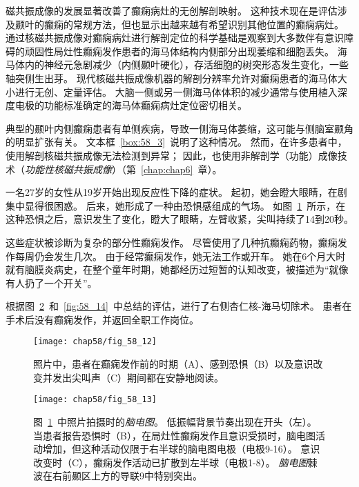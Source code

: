 磁共振成像的发展显著改善了癫痫病灶的无创解剖映射。
这种技术现在是评估涉及颞叶的癫痫的常规方法，但也显示出越来越有希望识别其他位置的癫痫病灶。
通过核磁共振成像对癫痫病灶进行解剖定位的科学基础是观察到大多数伴有意识障碍的顽固性局灶性癫痫发作患者的海马体结构内侧部分出现萎缩和细胞丢失。
海马体内的神经元急剧减少（内侧颞叶硬化），存活细胞的树突形态发生变化，一些轴突侧生出芽。
现代核磁共振成像机器的解剖分辨率允许对癫痫患者的海马体大小进行无创、定量评估。
大脑一侧或另一侧海马体体积的减少通常与使用植入深度电极的功能标准确定的海马体癫痫病灶定位密切相关。


典型的颞叶内侧癫痫患者有单侧疾病，导致一侧海马体萎缩，这可能与侧脑室颞角的明显扩张有关。
文本框~\ref{box:58_3}~说明了这种情况。
然而，在许多患者中，使用解剖核磁共振成像无法检测到异常；
因此，也使用非解剖学（功能）成像技术（\textit{功能性核磁共振成像}）（第~\ref{chap:chap6}~章）。


\begin{proposition}[神经解剖学导航术语] \label{box:58_3}
	
	\quad \quad 一名27岁的女性从19岁开始出现反应性下降的症状。
	起初，她会瞪大眼睛，在剧集中显得很困惑。
	后来，她形成了一种由恐惧感组成的气场。
	如图~\ref{fig:58_12}~所示，在这种恐惧之后，意识发生了变化，瞪大了眼睛，左臂收紧，尖叫持续了14到20秒。
	
	\quad \quad 这些症状被诊断为复杂的部分性癫痫发作。
	尽管使用了几种抗癫痫药物，癫痫发作每周仍会发生几次。
	由于经常癫痫发作，她无法工作或开车。
	她在6个月大时就有脑膜炎病史，在整个童年时期，她都经历过短暂的认知改变，被描述为“就像有人扔了一个开关”。
	
	\quad \quad 根据图~\ref{fig:58_13}~和~\ref{fig:58_14}~中总结的评估，进行了右侧杏仁核-海马切除术。
	患者在手术后没有癫痫发作，并返回全职工作岗位。
	
\end{proposition}


\begin{figure}[htbp]
	\centering
	\texttt{[image: chap58/fig\_58\_12]}
	\caption{照片中，患者在癫痫发作前的时期（A）、感到恐惧（B）以及意识改变并发出尖叫声（C）期间都在安静地阅读。}
	\label{fig:58_12}
\end{figure}


\begin{figure}[htbp]
	\centering
	\texttt{[image: chap58/fig\_58\_13]}
	\caption{图~\ref{fig:58_12}~中照片拍摄时的\textit{脑电图}。
		低振幅背景节奏出现在开头（左）。
		当患者报告恐惧时（B），在局灶性癫痫发作且意识受损时，脑电图活动增加，但这种活动仅限于右半球的脑电图电极（电极9-16）。
		意识改变时（C），癫痫发作活动已扩散到左半球（电极1-8）。
		\textit{脑电图}棘波在右前颞区上方的导联9中特别突出。}
	\label{fig:58_13}
\end{figure}


